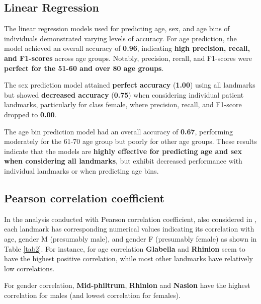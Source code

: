 \documentclass[journal,article,submit,pdftex,moreauthors]{Definitions/mdpi}
\begin{document}
\subsection*{Linear Regression}

The linear regression models used for predicting age, sex, and age bins of individuals demonstrated varying levels of accuracy. For age prediction, the model achieved an overall accuracy of \textbf{0.96}, indicating \textbf{high precision, recall, and F1-scores} across age groups. Notably, precision, recall, and F1-scores were \textbf{perfect for the 51-60 and over 80 age groups}.

The sex prediction model attained \textbf{perfect accuracy} (\textbf{1.00}) using all landmarks but showed \textbf{decreased accuracy} (\textbf{0.75}) when considering individual patient landmarks, particularly for class female, where precision, recall, and F1-score dropped to \textbf{0.00}.

The age bin prediction model had an overall accuracy of \textbf{0.67}, performing moderately for the 61-70 age group but poorly for other age groups. These results indicate that the models are \textbf{highly effective for predicting age and sex when considering all landmarks}, but exhibit decreased performance with individual landmarks or when predicting age bins.

\subsection*{Pearson correlation coefficient}
\label{subsec:pearson-correlation}
In the analysis conducted with Pearson correlation coefficient, also considered in \cite{ref19}, each landmark has corresponding numerical values indicating its correlation with age, gender M (presumably male), and gender F (presumably female) as shown in Table \ref{tab2}. For instance, for age correlation \textbf{Glabella} and \textbf{Rhinion} seem to have the highest positive correlation, while most other landmarks have relatively low correlations.

For gender correlation, \textbf{Mid-philtrum}, \textbf{Rhinion} and \textbf{Nasion} have the highest correlation for males (and lowest correlation for females).
\end{document}
